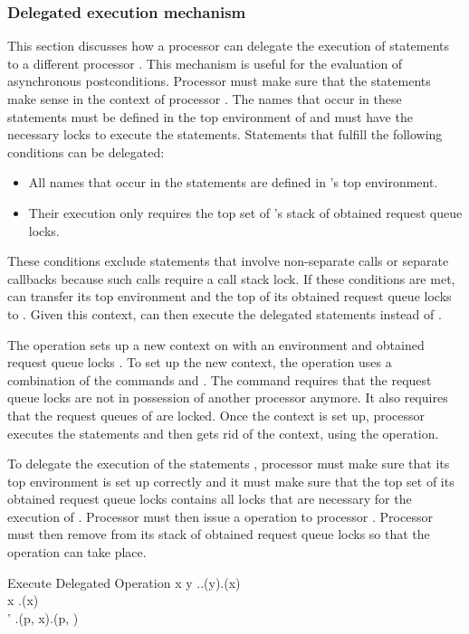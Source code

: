\subsubsection{Delegated execution mechanism}
This section discusses how a processor  can delegate the execution of statements to a different processor . This mechanism is useful for the evaluation of asynchronous postconditions. Processor  must make sure that the statements make sense in the context of processor . The names that occur in these statements must be defined in the top environment of  and  must have the necessary locks to execute the statements. 
Statements that fulfill the following conditions can be delegated:
\begin{itemize}
	\item All names that occur in the statements are defined in 's top environment.
	\item Their execution only requires the top set of 's stack of obtained request queue locks.
\end{itemize}
These conditions exclude statements that involve non-separate calls or separate callbacks because such calls require a call stack lock. If these conditions are met,  can transfer its top environment and the top of its obtained request queue locks to . Given this context,  can then execute the delegated statements instead of .

The  operation sets up a new context on  with an environment  and obtained request queue locks . To set up the new context, the operation uses a combination of the commands  and . The command  requires that the request queue locks  are not in possession of another processor anymore. It also requires that the request queues of  are locked. Once the context is set up, processor  executes the statements  and then gets rid of the context, using the  operation.

To delegate the execution of the statements , processor  must make sure that its top environment  is set up correctly and it must make sure that the top set of its obtained request queue locks contains all locks  that are necessary for the execution of . Processor  must then issue a  operation to processor . Processor  must then remove  from its stack of obtained request queue locks so that the  operation can take place.

\inferencerule
	{Execute Delegated Operation}
	{
		\forall x \in {} \colon \neg \exists y \in \state.\processorsfeature \colon \state.\requestqueuelocksfeature(y).\containsfeature(x) \\
		\forall x \in {} \colon \state.\isrequestqueuelockedfeature(x) \\
		\state' \mathematicaldefinition \state.\pushenvironmentfeature(p, x).\delegateobtainedrequestqueuelocksfeature(p, )
	}
	{}
	{}

